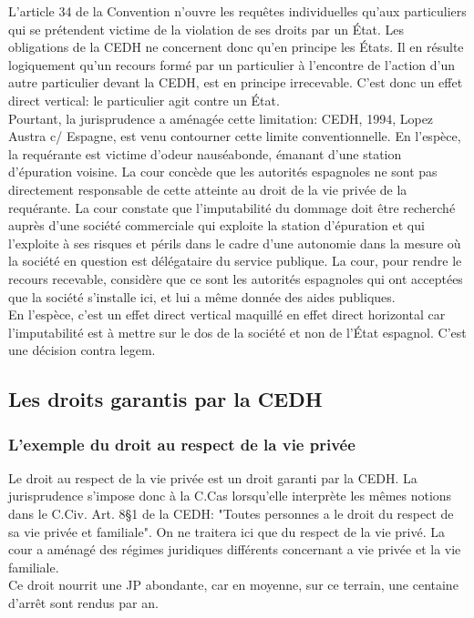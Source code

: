 \documentclass[10pt, a4paper, openany]{book}
\begin{document}
L'article 34 de la Convention n'ouvre les requêtes individuelles qu'aux particuliers qui se prétendent victime de la violation de ses droits par un État. Les obligations de la CEDH ne concernent donc qu'en principe les États. Il en résulte logiquement qu'un recours formé par un particulier à l'encontre de l'action d'un autre particulier devant la CEDH, est en principe irrecevable. C'est donc un effet direct vertical: le particulier agit contre un État. \\
Pourtant, la jurisprudence a aménagée cette limitation: CEDH, 1994, Lopez Austra c/ Espagne, est venu contourner cette limite conventionnelle. En l'espèce, la requérante est victime d'odeur nauséabonde, émanant d'une station d'épuration voisine. La cour concède que les autorités espagnoles ne sont pas directement responsable de cette atteinte au droit de la vie privée de la requérante. La cour constate que l'imputabilité du dommage doit être recherché auprès d'une société commerciale qui exploite la station d'épuration et qui l'exploite à ses risques et périls dans le cadre d'une autonomie dans la mesure où la société en question est délégataire du service publique. La cour, pour rendre le recours recevable, considère que ce sont les autorités espagnoles qui ont acceptées que la société s'installe ici, et lui a même donnée des aides publiques. \\
En l'espèce, c'est un effet direct vertical maquillé en effet direct horizontal car l'imputabilité est à mettre sur le dos de la société et non de l'État espagnol. C'est une décision contra legem. 


\subsection{Les droits garantis par la CEDH}

\subsubsection{L'exemple du droit au respect de la vie privée}

Le droit au respect de la vie privée est un droit garanti par la CEDH. La jurisprudence s'impose donc à la C.Cas lorsqu'elle interprète les mêmes notions dans le C.Civ. Art. 8§1 de la CEDH: "Toutes personnes a le droit du respect de sa vie privée et familiale". On ne traitera ici que du respect de la vie privé. La cour a aménagé des régimes juridiques différents concernant a vie privée et la vie familiale. \\
Ce droit nourrit une JP abondante, car en moyenne, sur ce terrain, une centaine d'arrêt sont rendus par an. 
\end{document}
